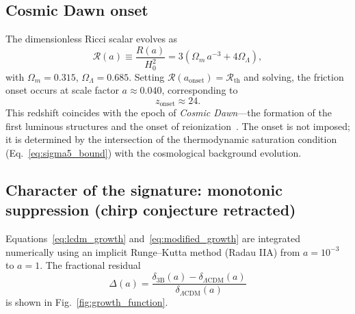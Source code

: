 \documentclass[aps,prd,twocolumn,superscriptaddress,nofootinbib]{revtex4-2}
\theoremstyle{definition}
\theoremstyle{remark}
\newcommand{\Rth}{\mathcal{R}_{\mathrm{th}}}
\begin{document}
\subsection{Cosmic Dawn onset}

The dimensionless Ricci scalar evolves as
\begin{equation}
\mathcal{R}(a) \equiv \frac{R(a)}{H_0^2} = 3(\Omega_m\, a^{-3} + 4\Omega_\Lambda),
\end{equation}
with $\Omega_m = 0.315$, $\Omega_\Lambda = 0.685$. Setting
$\mathcal{R}(a_{\mathrm{onset}}) = \Rth$ and solving, the friction onset
occurs at scale factor $a \approx 0.040$, corresponding to
\begin{equation}
z_{\mathrm{onset}} \approx 24.
\label{eq:onset_redshift}
\end{equation}
This redshift coincides with the epoch of \textit{Cosmic Dawn}---the
formation of the first luminous structures and the onset of
reionization~\cite{Bouwens2015,Robertson2022}. The onset is not imposed;
it is determined by the intersection of the thermodynamic saturation
condition (Eq.~\eqref{eq:sigma5_bound}) with the cosmological background
evolution.

\subsection{Character of the signature: monotonic suppression
(chirp conjecture retracted)}
\label{sec:chirp_retraction}

Equations~\eqref{eq:lcdm_growth} and~\eqref{eq:modified_growth} are
integrated numerically using an implicit Runge--Kutta method (Radau IIA)
from $a = 10^{-3}$ to $a = 1$. The fractional residual
\begin{equation}
\Delta(a) = \frac{\delta_{\mathrm{3B}}(a) - \delta_{\Lambda\mathrm{CDM}}(a)}
{\delta_{\Lambda\mathrm{CDM}}(a)}
\label{eq:residual}
\end{equation}
is shown in Fig.~\ref{fig:growth_function}.
\end{document}
